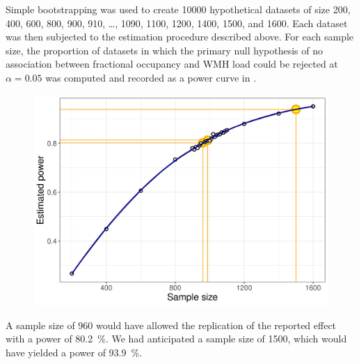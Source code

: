 Simple bootstrapping was used to create \num{10000} hypothetical datasets of size \num{200}, \num{400}, \num{600}, \num{800}, \num{900}, \num{910}, \ldots, \num{1090}, \num{1100}, \num{1200}, \num{1400}, \num{1500}, and \num{1600}.
Each dataset was then subjected to the estimation procedure described above.
For each sample size, the proportion of datasets in which the primary null hypothesis of no association between fractional occupancy and WMH load could be rejected at $\alpha=0.05$ was computed and recorded as a power curve in .

\begin{figure}
    \includegraphics[width=.5\linewidth]{./../analysis/derivatives/power-1.png}
    \label{fig:power}
\end{figure}

A sample size of \num{960} would have allowed the replication of the reported effect with a power of \qty{80.2}{\percent}.
We had anticipated a sample size of \num{1500}, which would have yielded a power of \qty{93.9}{\percent}.


